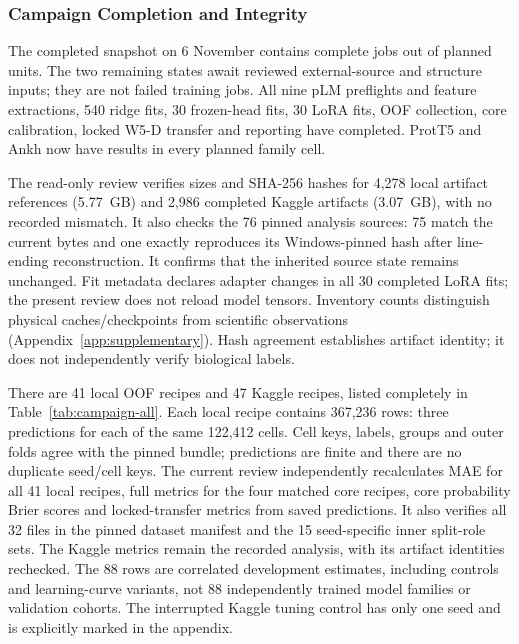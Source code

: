 \subsubsection{Campaign Completion and Integrity}\label{sec:campaign-results}
The completed snapshot on 6 November contains \nCampaignComplete{} complete jobs out of
\nCampaignTotal{} planned units. The two remaining states await reviewed external-source and
structure inputs; they are not failed training jobs. All nine pLM preflights and feature extractions,
540 ridge fits, 30 frozen-head fits, 30 LoRA fits, OOF collection, core calibration, locked W5-D
transfer and reporting have completed. ProtT5 and Ankh now have results in every planned family cell.

The read-only review verifies sizes and SHA-256 hashes for 4,278 local artifact references
(5.77~GB) and 2,986 completed Kaggle artifacts (3.07~GB), with no recorded mismatch. It also
checks the 76 pinned analysis sources: 75 match the current bytes and one exactly reproduces its
Windows-pinned hash after line-ending reconstruction. It confirms that the inherited source state
remains unchanged. Fit metadata declares adapter changes in all 30 completed LoRA fits; the present
review does not reload model tensors. Inventory counts distinguish
physical caches/checkpoints from scientific observations (Appendix~\ref{app:supplementary}).
Hash agreement establishes artifact identity; it does not independently verify biological labels.

There are 41 local OOF recipes and 47 Kaggle recipes, listed completely in
Table~\ref{tab:campaign-all}. Each local recipe contains 367,236 rows: three predictions for each
of the same 122,412 cells. Cell keys, labels, groups and outer folds agree with the pinned bundle;
predictions are finite and there are no duplicate seed/cell keys. The current review independently
recalculates MAE for all 41 local recipes, full metrics for the four matched core recipes, core
probability Brier scores and locked-transfer metrics from saved predictions. It also verifies all
32 files in the pinned dataset manifest and the 15 seed-specific inner split-role sets. The Kaggle
metrics remain the recorded analysis, with its artifact identities rechecked. The 88 rows are correlated
development estimates, including controls and
learning-curve variants, not 88 independently trained model families or validation cohorts.
The interrupted Kaggle tuning control has only one seed and is explicitly marked in the appendix.

